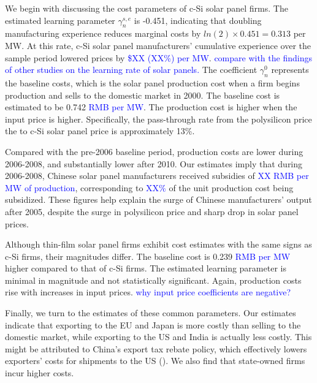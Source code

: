 \documentclass[12pt, letter]{article}
\begin{document}
We begin with discussing the cost parameters of c-Si solar panel firms. The estimated learning parameter $\gamma_n^{s,e}$ is -0.451, indicating that doubling manufacturing experience reduces marginal costs by $ln(2)\times 0.451 = 0.313$ per MW. At this rate, c-Si solar panel manufacturers' cumulative experience over the sample period lowered prices by \textcolor{blue}{\$XX (XX\%) per MW}.
\textcolor{blue}{compare with the findings of other studies on the learning rate of solar panels.} The coefficient $\gamma_n^{0}$ represents the baseline costs, which is the solar panel production cost when a firm begins production and sells to the domestic market in 2000. The baseline cost is estimated to be 0.742 \textcolor{blue}{RMB per MW}. The production cost is higher when the input price is higher. Specifically, the pass-through rate from the polysilicon price the to c-Si solar panel price is approximately 13\%.   

Compared with the pre-2006 baseline period, production costs are lower during 2006-2008, and substantially lower after 2010.
Our estimates imply that during 2006-2008, Chinese solar panel manufacturers received subsidies of \textcolor{blue}{XX RMB per MW of production}, corresponding to \textcolor{blue}{XX\%} of the unit production cost being subsidized. These figures help explain the surge of Chinese manufacturers’ output after 2005, despite the surge in polysilicon price and sharp drop in solar panel prices.

Although thin-film solar panel firms exhibit cost estimates with the same signs as c-Si firms, their magnitudes differ. The baseline cost is 0.239 \textcolor{blue}{RMB per MW} higher compared to that of c-Si firms. The estimated learning parameter is minimal in magnitude and not statistically significant. Again, production costs rise with increases in input prices. \textcolor{blue}{why input price coefficients are negative?}

Finally, we turn to the estimates of these common parameters. Our estimates indicate that exporting to the EU and Japan is more costly than selling to the domestic market, while exporting to the US and India is actually less costly. This might be attributed to China’s export tax rebate policy, which effectively lowers exporters’ costs for shipments to the US (\cite{chandra2013vat}). We also find that state-owned firms incur higher costs. 
\end{document}
